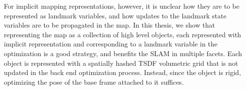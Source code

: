 For implicit mapping representations, however, it is unclear how they are to be represented as landmark variables, and how updates to the landmark state variables are to be propagated in the map. In this thesis, we show that representing the map as a collection of high level objects, each represented with implicit representation and corresponding to a landmark variable in the optimization is a good strategy, and benefits the SLAM in multiple facets. Each object is represented with a spatially hashed TSDF volumetric grid \cite{prisacariuInfiniTAMV3Framework2017} \cite{niessnerRealtime3DReconstruction2013} \cite{dongGPUAcceleratedRobust2019} that is not updated in the back end optimization process. Instead, since the object is rigid, optimizing the pose of the base frame attached to it suffices.
\clearpage

